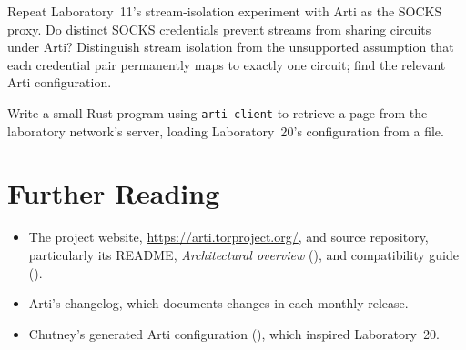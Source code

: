 \begin{esercizio}[2]\label{es:30-isolamento}
Repeat Laboratory~11's stream-isolation experiment with Arti as the SOCKS proxy. Do distinct SOCKS credentials prevent streams from sharing circuits under Arti? Distinguish stream isolation from the unsupported assumption that each credential pair permanently maps to exactly one circuit; find the relevant Arti configuration.
\end{esercizio}

\begin{esercizio}[3]\label{es:30-libreria}
Write a small Rust program using \texttt{arti-client} to retrieve a page from the laboratory network's server, loading Laboratory~20's configuration from a file.
\end{esercizio}

\section*{Further Reading}
\begin{itemize}
  \item The project website, \url{https://arti.torproject.org/}, and source repository, particularly its README, \emph{Architectural overview} (), and compatibility guide ().
  \item Arti's changelog, which documents changes in each monthly release.
  \item Chutney's generated Arti configuration (), which inspired Laboratory~20.
\end{itemize}
